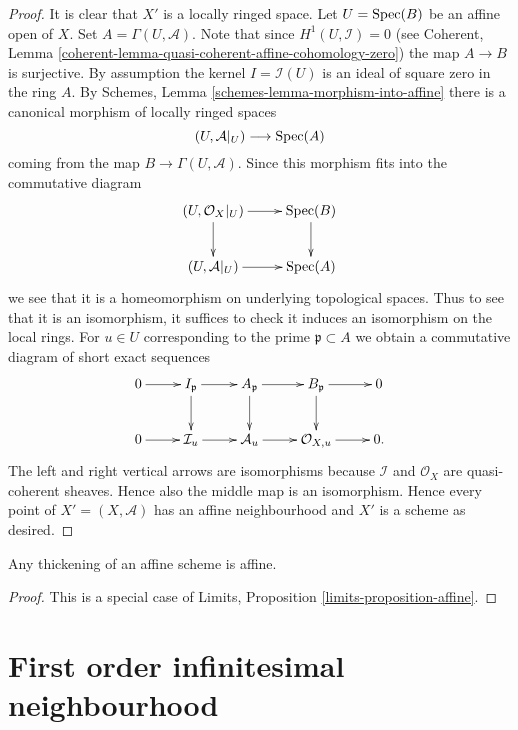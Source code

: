 \begin{proof}
It is clear that $X'$ is a locally ringed space. Let $U = \mathop{\rm Spec}(B)$
be an affine open of $X$. Set $A = \Gamma(U, \mathcal{A})$. Note that
since $H^1(U, \mathcal{I}) = 0$ (see
Coherent, Lemma \ref{coherent-lemma-quasi-coherent-affine-cohomology-zero})
the map $A \to B$ is surjective. By assumption the kernel
$I = \mathcal{I}(U)$ is an ideal of square zero in the ring $A$.
By
Schemes, Lemma \ref{schemes-lemma-morphism-into-affine}
there is a canonical morphism of locally ringed spaces
$$
(U, \mathcal{A}|_U) \longrightarrow \mathop{\rm Spec}(A)
$$
coming from the map $B \to \Gamma(U, \mathcal{A})$. Since this morphism
fits into the commutative diagram
$$
\xymatrix{
(U, \mathcal{O}_X|_U) \ar[d] \ar[r] & \Spec(B) \ar[d] \\
(U, \mathcal{A}|_U) \ar[r] & \Spec(A)
}
$$
we see that it is a homeomorphism on underlying topological spaces.
Thus to see that it is an isomorphism, it suffices to check it induces
an isomorphism on the local rings.
For $u \in U$ corresponding to the prime $\mathfrak p \subset A$
we obtain a commutative diagram of short exact sequences
$$
\xymatrix{
0 \ar[r] &
I_{\mathfrak p} \ar[r] \ar[d] &
A_{\mathfrak p} \ar[r] \ar[d] &
B_{\mathfrak p} \ar[r] \ar[d] & 0 \\
0 \ar[r] &
\mathcal{I}_u \ar[r] &
\mathcal{A}_u \ar[r] &
\mathcal{O}_{X, u} \ar[r] & 0.
}
$$
The left and right vertical arrows are isomorphisms because
$\mathcal{I}$ and $\mathcal{O}_X$ are quasi-coherent sheaves.
Hence also the middle map is an isomorphism. Hence every point
of $X' = (X, \mathcal{A})$ has an affine neighbourhood and $X'$ is a
scheme as desired.
\end{proof}

\begin{lemma}
\label{lemma-thickening-affine-scheme}
Any thickening of an affine scheme is affine.
\end{lemma}

\begin{proof}
This is a special case of
Limits, Proposition \ref{limits-proposition-affine}.
\end{proof}














\section{First order infinitesimal neighbourhood}
\label{section-first-order-infinitesimal-neighbourhood}

